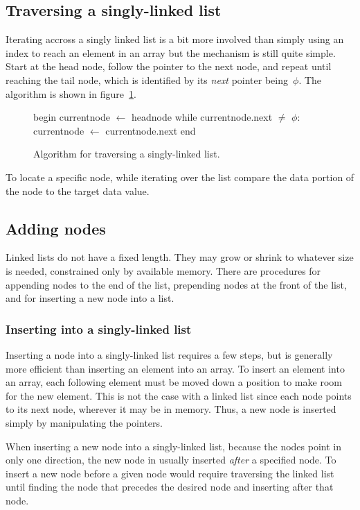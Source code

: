 \documentclass{article}
\begin{document}
  \subsection{Traversing a singly-linked list}
  Iterating accross a singly linked list is a bit more involved than simply using an index to reach an element in an array but the mechanism is still quite simple. Start at the head node, follow the pointer to the next node, and repeat until reaching the tail node, which is identified by its \emph{next} pointer being~$\phi$. The algorithm is shown in figure~\ref{fig:alg:singlelinkedlist-traverse}.
  \begin{figure}[h]
  \begin{algorithm}
    begin
      currentnode $\gets$ headnode
      while currentnode.next $\ne$ $\phi$:
        currentnode $\gets$ currentnode.next
    end\end{algorithm}
    \caption{Algorithm for traversing a singly-linked list.}
    \label{fig:alg:singlelinkedlist-traverse}
  \end{figure}

  To locate a specific node, while iterating over the list compare the data portion of the node to the target data value.
  \subsection{Adding nodes}
  Linked lists do not have a fixed length. They may grow or shrink to whatever size is needed, constrained only by available memory. There are procedures for appending nodes to the end of the list, prepending nodes at the front of the list, and for inserting a new node into a list.
  \subsubsection{Inserting into a singly-linked list}
  Inserting a node into a singly-linked list requires a few steps, but is generally more efficient than inserting an element into an array. To insert an element into an array, each following element must be moved down a position to make room for the new element. This is not the case with a linked list since each node points to its next node, wherever it may be in memory. Thus, a new node is inserted simply by manipulating the pointers.

  When inserting a new node into a singly-linked list, because the nodes point in only one direction, the new node in usually inserted \emph{after} a specified node. To insert a new node before a given node would require traversing the linked list until finding the node that precedes the desired node and inserting after that node.
\end{document}
